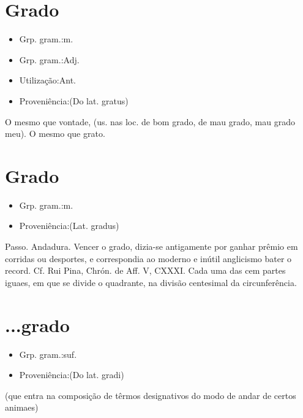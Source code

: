 \section{Grado}
\begin{itemize}
\item {Grp. gram.:m.}
\end{itemize}
\begin{itemize}
\item {Grp. gram.:Adj.}
\end{itemize}
\begin{itemize}
\item {Utilização:Ant.}
\end{itemize}
\begin{itemize}
\item {Proveniência:(Do lat. \textunderscore gratus\textunderscore )}
\end{itemize}
O mesmo que \textunderscore vontade\textunderscore , (us. nas loc. \textunderscore de bom grado\textunderscore , \textunderscore de mau grado\textunderscore , \textunderscore mau grado meu\textunderscore ).
O mesmo que \textunderscore grato\textunderscore .
\section{Grado}
\begin{itemize}
\item {Grp. gram.:m.}
\end{itemize}
\begin{itemize}
\item {Proveniência:(Lat. \textunderscore gradus\textunderscore )}
\end{itemize}
Passo.
Andadura.
\textunderscore Vencer o grado\textunderscore , dizia-se antigamente por ganhar prêmio em corridas ou desportes, e correspondia ao moderno e inútil anglicismo \textunderscore bater o record\textunderscore . Cf. Rui Pina, \textunderscore Chrón. de Aff. V\textunderscore , CXXXI.
Cada uma das cem partes iguaes, em que se divide o quadrante, na divisão centesimal da circunferência.
\section{...grado}
\begin{itemize}
\item {Grp. gram.:suf.}
\end{itemize}
\begin{itemize}
\item {Proveniência:(Do lat. \textunderscore gradi\textunderscore )}
\end{itemize}
(que entra na composição de têrmos designativos do modo de andar de certos animaes)
